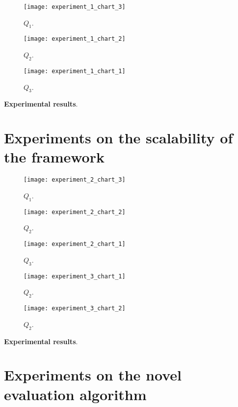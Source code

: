 \begin{figure}[H]
  \centering
  \texttt{[image: experiment\_1\_chart\_3]}
  \caption{$Q_{1}$.}
  \label{fig:???}
\end{figure}

\begin{figure}[H]
  \centering
  \texttt{[image: experiment\_1\_chart\_2]}
  \caption{$Q_{2}$.}
  \label{fig:???}
\end{figure}

\begin{figure}[H]
  \centering
  \texttt{[image: experiment\_1\_chart\_1]}
  \caption{$Q_{3}$.}
  \label{fig:???}
\end{figure}


\textbf{Experimental results}.

\section{Experiments on the scalability of the framework}\label{sec:scalability}

\begin{figure}[H]
  \centering
  \texttt{[image: experiment\_2\_chart\_3]}
  \caption{$Q_{1}$.}
  \label{fig:???}
\end{figure}

\begin{figure}[H]
  \centering
  \texttt{[image: experiment\_2\_chart\_2]}
  \caption{$Q_{2}$.}
  \label{fig:???}
\end{figure}

\begin{figure}[H]
  \centering
  \texttt{[image: experiment\_2\_chart\_1]}
  \caption{$Q_{3}$.}
  \label{fig:???}
\end{figure}



\begin{figure}[H]
  \centering
  \texttt{[image: experiment\_3\_chart\_1]}
  \caption{$Q_{2}$.}
  \label{fig:???}
\end{figure}

\begin{figure}[H]
  \centering
  \texttt{[image: experiment\_3\_chart\_2]}
  \caption{$Q_{2}$.}
  \label{fig:???}
\end{figure}

\textbf{Experimental results}.

\section{Experiments on the novel evaluation algorithm}\label{sec:new-algorithm}

